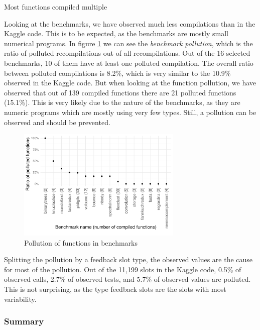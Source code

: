Most functions compiled multiple \todoadd

Looking at the benchmarks, we have observed much less compilations than in the Kaggle code. This is to be expected, as the benchmarks are mostly small numerical programs. In figure \ref{fig:bench-pollution} we can see the \textit{benchmark pollution}, which is the ratio of polluted recompilations out of all recompilations. Out of the 16 selected benchmarks, 10 of them have at least one polluted compilation. The overall ratio between polluted compilations is 8.2\%, which is very similar to the 10.9\% observed in the Kaggle code. But when looking at the function pollution, we have observed that out of 139 compiled functions there are 21 polluted functions (15.1\%). This is very likely due to the nature of the benchmarks, as they are numeric programs which are mostly using very few types. Still, a pollution can be observed and should be prevented.

\begin{figure}
	\centering
	\includegraphics[width=0.7\textwidth]{figures/pollution/master/benchmark-pollutionBW.pdf}
	\caption{Pollution of functions in benchmarks\cite{feedback-vmil}}\label{fig:bench-pollution}
\end{figure}

Splitting the pollution by a feedback slot type, the observed values are the cause for most of the pollution. Out of the 11,199 slots in the Kaggle code, 0.5\% of observed calls, 2.7\% of observed tests, and 5.7\% of observed values are polluted. This is not surprising, as the type feedback slots are the slots with most variability.


\subsubsection*{Summary}

